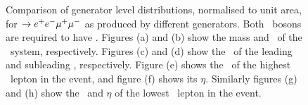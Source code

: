 \begin{figure}
{    }
        \vspace{-2mm}
        \vspace{-2mm}
    \caption[Comparison of generator level distributions, normalised to
    unit area, for \qqZZ $\ra\eemm$ as produced by different generators.]{\small Comparison of generator level distributions, normalised to
    unit area, for \qqZZ $\ra\eemm$ as produced by different generators. Both 
    \Z\ bosons
    are required to have \sstooos. Figures (a)
    and (b) show the mass and \pt\ of the \ZZ\ system,
    respectively. Figures (c) and (d) show the \pt\ of the
    leading and subleading \Z, respectively. Figure (e) shows the \pt\ of the highest \pt\ lepton in the event, and figure (f) shows its
   $\eta$. Similarly figures (g) and (h) show the \pt\ and $\eta$ of the lowest
   \pt\ lepton in the event.}
    \label{fig:gen-comp-ZZ}
\end{figure}

